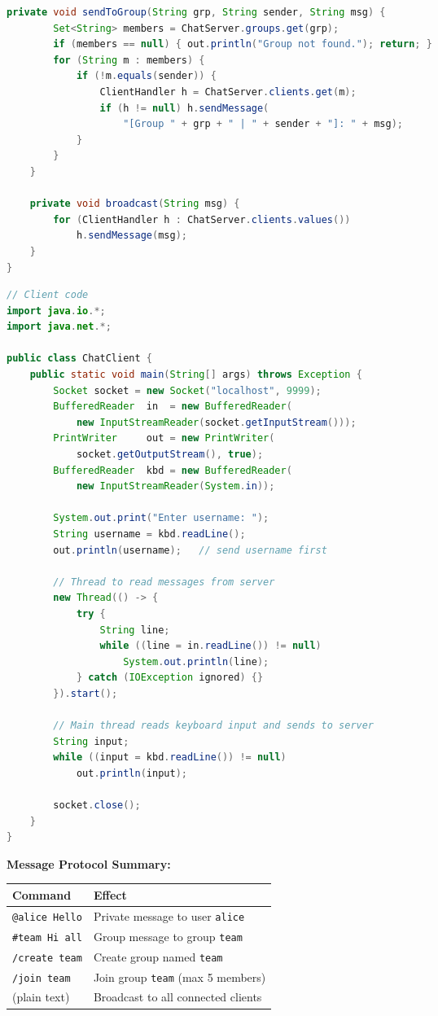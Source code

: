 \documentclass[12pt,a3paper]{article}
\begin{document}
\begin{enumerate}
\begin{tcolorbox}
\begin{lstlisting}[language=Java]
    private void sendToGroup(String grp, String sender, String msg) {
        Set<String> members = ChatServer.groups.get(grp);
        if (members == null) { out.println("Group not found."); return; }
        for (String m : members) {
            if (!m.equals(sender)) {
                ClientHandler h = ChatServer.clients.get(m);
                if (h != null) h.sendMessage(
                    "[Group " + grp + " | " + sender + "]: " + msg);
            }
        }
    }

    private void broadcast(String msg) {
        for (ClientHandler h : ChatServer.clients.values())
            h.sendMessage(msg);
    }
}
\end{lstlisting}

\begin{lstlisting}[language=Java]
// Client code
import java.io.*;
import java.net.*;

public class ChatClient {
    public static void main(String[] args) throws Exception {
        Socket socket = new Socket("localhost", 9999);
        BufferedReader  in  = new BufferedReader(
            new InputStreamReader(socket.getInputStream()));
        PrintWriter     out = new PrintWriter(
            socket.getOutputStream(), true);
        BufferedReader  kbd = new BufferedReader(
            new InputStreamReader(System.in));

        System.out.print("Enter username: ");
        String username = kbd.readLine();
        out.println(username);   // send username first

        // Thread to read messages from server
        new Thread(() -> {
            try {
                String line;
                while ((line = in.readLine()) != null)
                    System.out.println(line);
            } catch (IOException ignored) {}
        }).start();

        // Main thread reads keyboard input and sends to server
        String input;
        while ((input = kbd.readLine()) != null)
            out.println(input);

        socket.close();
    }
}
\end{lstlisting}

\medskip
\textbf{Message Protocol Summary:}

\begin{center}
\small
\begin{tabular}{@{}ll@{}}
\toprule
\textbf{Command} & \textbf{Effect} \\
\midrule
\texttt{@alice Hello}     & Private message to user \texttt{alice} \\
\texttt{\#team Hi all}    & Group message to group \texttt{team} \\
\texttt{/create team}     & Create group named \texttt{team} \\
\texttt{/join team}       & Join group \texttt{team} (max 5 members) \\
(plain text)              & Broadcast to all connected clients \\
\bottomrule
\end{tabular}
\end{center}


\end{tcolorbox}
\end{enumerate}
\end{document}
